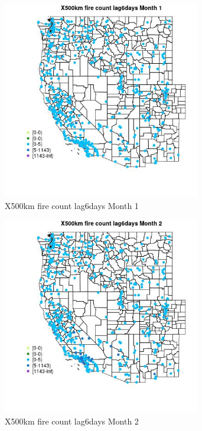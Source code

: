 \begin{figure} 
\centering  
\includegraphics[width=0.77\textwidth]{Code_Outputs/Report_ML_input_PM25_Step4_part_e_de_duplicated_aves_compiled_2019-05-14wNAs_MapObsMo1X500km_fire_count_lag6days.jpg} 
\caption{\label{fig:Report_ML_input_PM25_Step4_part_e_de_duplicated_aves_compiled_2019-05-14wNAsMapObsMo1X500km_fire_count_lag6days}X500km fire count lag6days Month 1} 
\end{figure} 
 

\clearpage 

\begin{figure} 
\centering  
\includegraphics[width=0.77\textwidth]{Code_Outputs/Report_ML_input_PM25_Step4_part_e_de_duplicated_aves_compiled_2019-05-14wNAs_MapObsMo2X500km_fire_count_lag6days.jpg} 
\caption{\label{fig:Report_ML_input_PM25_Step4_part_e_de_duplicated_aves_compiled_2019-05-14wNAsMapObsMo2X500km_fire_count_lag6days}X500km fire count lag6days Month 2} 
\end{figure} 
 

